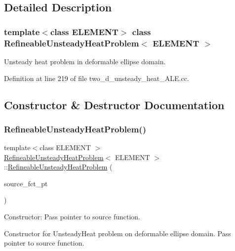 \subsection{Detailed Description}
\subsubsection*{template$<$class E\+L\+E\+M\+E\+NT$>$\newline
class Refineable\+Unsteady\+Heat\+Problem$<$ E\+L\+E\+M\+E\+N\+T $>$}

Unsteady heat problem in deformable ellipse domain. 

Definition at line 219 of file two\+\_\+d\+\_\+unsteady\+\_\+heat\+\_\+\+A\+L\+E.\+cc.



\subsection{Constructor \& Destructor Documentation}
\mbox{\label{classRefineableUnsteadyHeatProblem_a894f3bd6c1c23c307a736de6898e4e98}} 
\subsubsection{\texorpdfstring{Refineable\+Unsteady\+Heat\+Problem()}{RefineableUnsteadyHeatProblem()}}
{\footnotesize\ttfamily template$<$class E\+L\+E\+M\+E\+NT $>$ \\
\hyperlink{classRefineableUnsteadyHeatProblem}{Refineable\+Unsteady\+Heat\+Problem}$<$ E\+L\+E\+M\+E\+NT $>$\+::\hyperlink{classRefineableUnsteadyHeatProblem}{Refineable\+Unsteady\+Heat\+Problem} (\begin{DoxyParamCaption}\item[{Unsteady\+Heat\+Equations$<$ 2 $>$\+::Unsteady\+Heat\+Source\+Fct\+Pt}]{source\+\_\+fct\+\_\+pt }\end{DoxyParamCaption})}



Constructor\+: Pass pointer to source function. 

Constructor for Unsteady\+Heat problem on deformable ellipse domain. Pass pointer to source function. 

